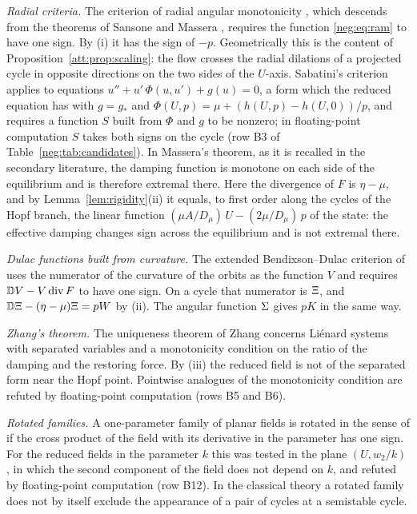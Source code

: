 \emph{Radial criteria.} The criterion of radial angular monotonicity \cite[Theorem~6]{SV10}, which descends from the theorems of Sansone and Massera \cite{Massera54}, requires the function \eqref{neg:eq:ram} to have one sign. By (i) it has the sign of $-p$. Geometrically this is the content of Proposition~\ref{att:prop:scaling}: the flow crosses the radial dilations of a projected cycle in opposite directions on the two sides of the $U$-axis. Sabatini's criterion \cite{Sabatini10} applies to equations $u''+u'\,\Phi(u,u')+g(u)=0$, a form which the reduced equation has with $g=g_\ast$ and $\Phi(U,p)=\mu+(h(U,p)-h(U,0))/p$, and requires a function $S$ built from $\Phi$ and $g$ to be nonzero; in floating-point computation $S$ takes both signs on the cycle (row B3 of Table~\ref{neg:tab:candidates}). In Massera's theorem, as it is recalled in the secondary literature, the damping function is monotone on each side of the equilibrium and is therefore extremal there. Here the divergence of $F$ is $\eta-\mu$, and by Lemma~\ref{lem:rigidity}(ii) it equals, to first order along the cycles of the Hopf branch, the linear function $(\mu A/D_\mu)\,U-(2\mu/D_\mu)\,p$ of the state: the effective damping changes sign across the equilibrium and is not extremal there.

\emph{Dulac functions built from curvature.} The extended Bendixson--Dulac criterion of \cite[Theorem~2.3]{GG21} uses the numerator of the curvature of the orbits as the function $V$ and requires $\mathbb D V-V\operatorname{div} F$ to have one sign. On a cycle that numerator is $\Xi$, and $\mathbb D\Xi-(\eta-\mu)\Xi=pW$ by (ii). The angular function $\Sigma$ gives $pK$ in the same way.

\emph{Zhang's theorem.} The uniqueness theorem of Zhang \cite{Zhang86} concerns Li\'enard systems with separated variables and a monotonicity condition on the ratio of the damping and the restoring force. By (iii) the reduced field is not of the separated form near the Hopf point. Pointwise analogues of the monotonicity condition are refuted by floating-point computation (rows B5 and B6).

\emph{Rotated families.} A one-parameter family of planar fields is rotated in the sense of \cite{Duff53} if the cross product of the field with its derivative in the parameter has one sign. For the reduced fields in the parameter $k$ this was tested in the plane $(U,w_2/k)$, in which the second component of the field does not depend on $k$, and refuted by floating-point computation (row B12). In the classical theory a rotated family does not by itself exclude the appearance of a pair of cycles at a semistable cycle.

